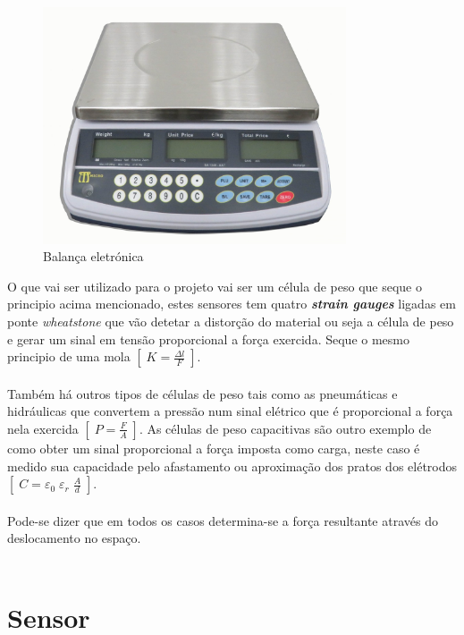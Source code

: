 \begin{figure}[H]
	\centering
	\includegraphics[height=7cm]{./image/PESTA/general/Scale_1.jpg}
	\caption{Balança eletrónica}
	\label{Sale}
\end{figure}
O que vai ser utilizado para o projeto vai ser um célula de peso que seque o principio acima mencionado, estes sensores tem quatro \textit{\textbf{strain gauges}} ligadas em ponte \textit{wheatstone} que vão detetar a distorção do material ou seja a célula de peso e gerar um sinal em tensão proporcional a força exercida. Seque o mesmo principio de uma mola $ [ \; K = \frac{\Delta l}{F} \; ] $.
\\
\\
Também há outros tipos de células de peso tais como as pneumáticas e hidráulicas que convertem a pressão num sinal elétrico que é proporcional a força nela exercida $ [ \; P = \frac{F}{A} \; ] $. As células de peso capacitivas são outro exemplo de como obter um sinal proporcional a força imposta como carga, neste caso é medido sua capacidade pelo afastamento ou aproximação dos pratos dos elétrodos $ [ \; C = \varepsilon_{0} \; \varepsilon_{r} \; \frac{A}{d} \; ] $.
\\
\\
Pode-se dizer que em todos os casos determina-se a força resultante através do deslocamento no espaço.\\
\\
\section*{Sensor}


